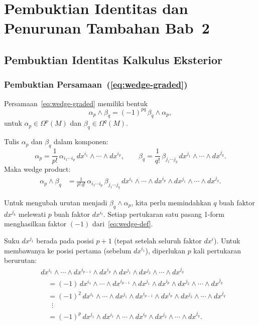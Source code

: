 \chapter{Pembuktian Identitas dan Penurunan Tambahan Bab~2}

\section{Pembuktian Identitas Kalkulus Eksterior}
\label{app:proofs-exterior}

\subsection{Pembuktian Persamaan~(\ref{eq:wedge-graded})}
\label{app:proof-wedge-graded}
 
Persamaan~\eqref{eq:wedge-graded} memiliki bentuk
\begin{equation*}
    \alpha_p \wedge \beta_q = (-1)^{pq}\,\beta_q \wedge \alpha_p,
\end{equation*}
untuk $\alpha_p \in \Omega^p(M)$ dan $\beta_q \in \Omega^q(M)$.
 
Tulis $\alpha_p$ dan $\beta_q$ dalam komponen:
\begin{equation}
    \alpha_p = \frac{1}{p!}\,\alpha_{i_1 \cdots i_p}\,dx^{i_1} \wedge \cdots \wedge dx^{i_p}, \qquad
    \beta_q = \frac{1}{q!}\,\beta_{j_1 \cdots j_q}\,dx^{j_1} \wedge \cdots \wedge dx^{j_q}.
\end{equation}
Maka wedge product:
\begin{align}
    \alpha_p \wedge \beta_q
    &= \frac{1}{p!\,q!}\,\alpha_{i_1 \cdots i_p}\,\beta_{j_1 \cdots j_q}\,
    dx^{i_1} \wedge \cdots \wedge dx^{i_p} \wedge dx^{j_1} \wedge \cdots \wedge dx^{j_q}. \label{app221-eq:start}
\end{align}
 
Untuk mengubah urutan menjadi $\beta_q \wedge \alpha_p$, kita perlu memindahkan $q$ buah faktor $dx^{j_k}$ melewati $p$ buah faktor $dx^{i_l}$. Setiap pertukaran satu pasang 1-form menghasilkan faktor $(-1)$ dari~\eqref{eq:wedge-def}.
 
Suku $dx^{j_1}$ berada pada posisi $p + 1$ (tepat setelah seluruh faktor $dx^{i}$). Untuk membawanya ke posisi pertama (sebelum $dx^{i_1}$), diperlukan $p$ kali pertukaran berurutan:
\begin{align}
    &dx^{i_1} \wedge \cdots \wedge dx^{i_{p-1}} \wedge dx^{i_p} \wedge dx^{j_1} \wedge dx^{j_2} \wedge \cdots \wedge dx^{j_q} \nonumber\\[3pt]
    &\quad = (-1)\,dx^{i_1} \wedge \cdots \wedge dx^{i_{p-1}} \wedge dx^{j_1} \wedge dx^{i_p} \wedge dx^{j_2} \wedge \cdots \wedge dx^{j_q} \nonumber\\[3pt]
    &\quad = (-1)^2\,dx^{i_1} \wedge \cdots \wedge dx^{j_1} \wedge dx^{i_{p-1}} \wedge dx^{i_p} \wedge dx^{j_2} \wedge \cdots \wedge dx^{j_q} \nonumber\\[3pt]
    &\quad\;\;\vdots \nonumber\\[3pt]
    &\quad = (-1)^p\,dx^{j_1} \wedge dx^{i_1} \wedge \cdots \wedge dx^{i_p} \wedge dx^{j_2} \wedge \cdots \wedge dx^{j_q}.
\end{align}
 

